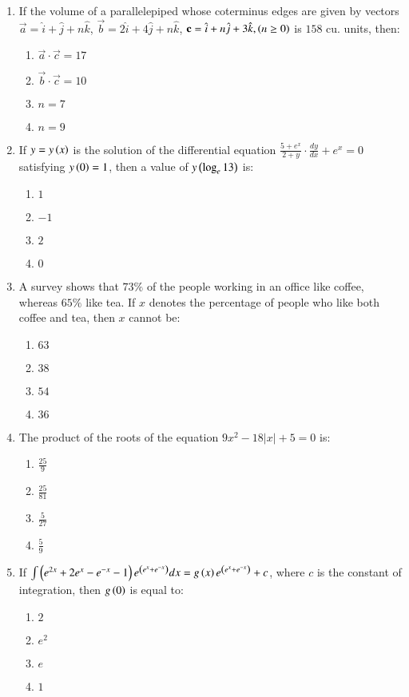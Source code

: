 \documentclass[journal]{IEEEtran}
\begin{document}
\begin{enumerate}
    \item If the volume of a parallelepiped whose coterminus edges are given by vectors $\vec{a} = \hat{i} + \hat{j} + n \hat{k}$, $\vec{b} = 2 \hat{i} + 4 \hat{j} + n \hat{k}$, $\mathbf{c} = \hat{i} + n \hat{j} + 3 \hat{k}, \left(n \geq 0\right)$ is $158$ cu. units, then:
    \begin{enumerate}
        \item $\vec{a} \cdot \vec{c} = 17$
        \item $\vec{b} \cdot \vec{c} = 10$
        \item $n = 7$
        \item $n = 9$
    \end{enumerate}

    \item If $y = y\left(x\right)$ is the solution of the differential equation $\frac{5 + e^x}{2+y} \cdot \frac{dy}{dx} + e^x = 0$ satisfying $y\left(0\right) = 1$, then a value of $y\left(\log_e 13\right)$ is:
    \begin{enumerate}
        \item $1$
        \item $-1$
        \item $2$
        \item $0$
    \end{enumerate}

    \item A survey shows that $73\%$ of the people working in an office like coffee, whereas $65\%$ like tea. If $x$ denotes the percentage of people who like both coffee and tea, then $x$ cannot be:
    \begin{enumerate}
        \item $63$
        \item $38$
        \item $54$
        \item $36$
    \end{enumerate}

    \item The product of the roots of the equation $9x^2 - 18|x| + 5 = 0$ is:
    \begin{enumerate}
        \item $\frac{25}{9}$
        \item $\frac{25}{81}$
        \item $\frac{5}{27}$
        \item $\frac{5}{9}$
    \end{enumerate}

    \item If $\int \left(e^{2x} + 2e^x - e^{-x} - 1\right) e^{\left(e^x + e^{-x}\right)} dx = g\left(x\right) e^{\left(e^x + e^{-x}\right)} + c $, where $c$ is the constant of integration, then $g\left(0\right)$ is equal to:
    \begin{enumerate}
        \item $2$
        \item $e^2$
        \item $e$
        \item $1$
    \end{enumerate}


\end{enumerate}
\end{document}
